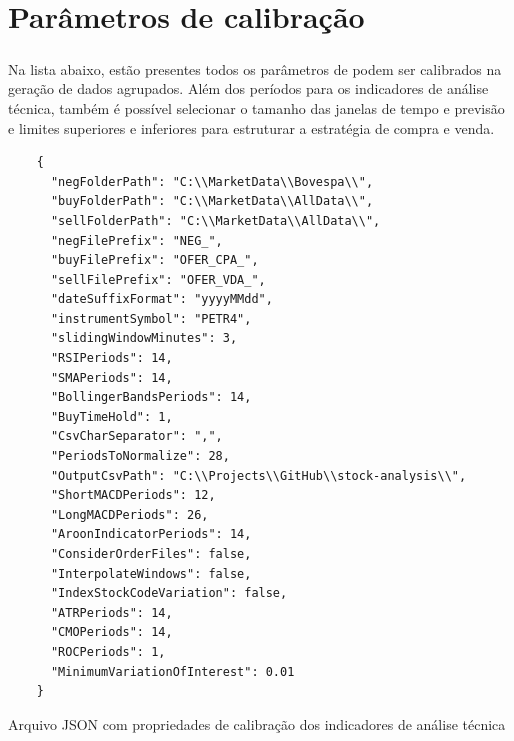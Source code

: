 \documentclass[grad,numbers]{coppe}
\begin{document}
        
  

  \backmatter
  
  

  \appendix 
  \chapter{Parâmetros de calibração}\label{cap:params}
  
    \paragraph{}Na lista abaixo, estão presentes todos os parâmetros de podem ser calibrados na geração de dados agrupados. Além dos períodos para os indicadores de análise técnica, também é possível selecionar o tamanho das janelas de tempo e previsão e limites superiores e inferiores para estruturar a estratégia de compra e venda.
  
    \begin{listing}
    \begin{verbatim}
    {
      "negFolderPath": "C:\\MarketData\\Bovespa\\",
      "buyFolderPath": "C:\\MarketData\\AllData\\",
      "sellFolderPath": "C:\\MarketData\\AllData\\",
      "negFilePrefix": "NEG_",
      "buyFilePrefix": "OFER_CPA_",
      "sellFilePrefix": "OFER_VDA_",
      "dateSuffixFormat": "yyyyMMdd",
      "instrumentSymbol": "PETR4",
      "slidingWindowMinutes": 3,
      "RSIPeriods": 14,
      "SMAPeriods": 14,
      "BollingerBandsPeriods": 14,
      "BuyTimeHold": 1,
      "CsvCharSeparator": ",",
      "PeriodsToNormalize": 28,
      "OutputCsvPath": "C:\\Projects\\GitHub\\stock-analysis\\",
      "ShortMACDPeriods": 12,
      "LongMACDPeriods": 26,
      "AroonIndicatorPeriods": 14,
      "ConsiderOrderFiles": false,
      "InterpolateWindows": false,
      "IndexStockCodeVariation": false,
      "ATRPeriods": 14,
      "CMOPeriods": 14,
      "ROCPeriods": 1,
      "MinimumVariationOfInterest": 0.01
    }
    \end{verbatim}
    \caption{Arquivo JSON com propriedades de calibração dos indicadores de análise técnica} 
    \label{json-example}
    \end{listing}
    
\end{document}

